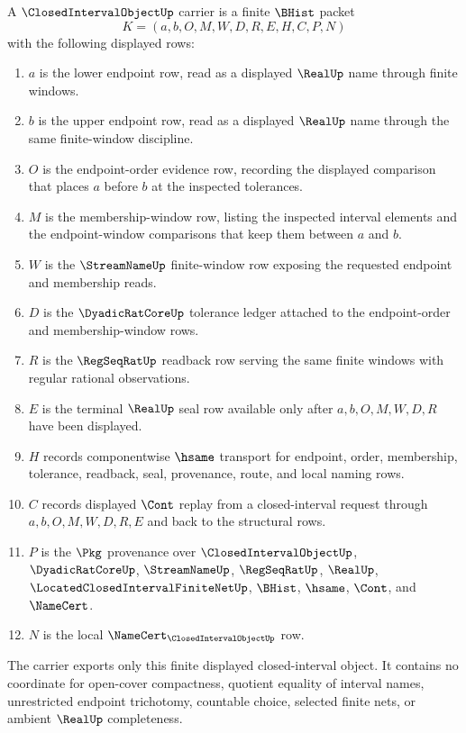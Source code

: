 \begin{definition}
\label{def:closed-interval-object-carrier}
A $\ClosedIntervalObjectUp$ carrier is a finite $\BHist$ packet
$$
K=(a,b,O,M,W,D,R,E,H,C,P,N)
$$
with the following displayed rows:
\begin{enumerate}
\item $a$ is the lower endpoint row, read as a displayed $\RealUp$ name through finite windows.
\item $b$ is the upper endpoint row, read as a displayed $\RealUp$ name through the same finite-window discipline.
\item $O$ is the endpoint-order evidence row, recording the displayed comparison that places $a$ before $b$ at the inspected tolerances.
\item $M$ is the membership-window row, listing the inspected interval elements and the endpoint-window comparisons that keep them between $a$ and $b$.
\item $W$ is the $\StreamNameUp$ finite-window row exposing the requested endpoint and membership reads.
\item $D$ is the $\DyadicRatCoreUp$ tolerance ledger attached to the endpoint-order and membership-window rows.
\item $R$ is the $\RegSeqRatUp$ readback row serving the same finite windows with regular rational observations.
\item $E$ is the terminal $\RealUp$ seal row available only after $a,b,O,M,W,D,R$ have been displayed.
\item $H$ records componentwise $\hsame$ transport for endpoint, order, membership, tolerance, readback, seal, provenance, route, and local naming rows.
\item $C$ records displayed $\Cont$ replay from a closed-interval request through $a,b,O,M,W,D,R,E$ and back to the structural rows.
\item $P$ is the $\Pkg$ provenance over $\ClosedIntervalObjectUp$, $\DyadicRatCoreUp$, $\StreamNameUp$, $\RegSeqRatUp$, $\RealUp$, $\LocatedClosedIntervalFiniteNetUp$, $\BHist$, $\hsame$, $\Cont$, and $\NameCert$.
\item $N$ is the local $\NameCert_{\ClosedIntervalObjectUp}$ row.
\end{enumerate}
The carrier exports only this finite displayed closed-interval object. It contains no coordinate for open-cover compactness, quotient equality of interval names, unrestricted endpoint trichotomy, countable choice, selected finite nets, or ambient $\RealUp$ completeness.
\end{definition}

